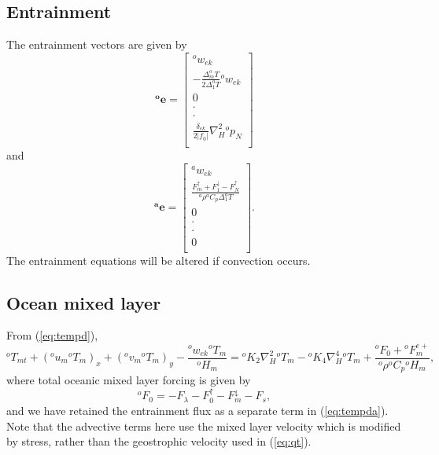 \documentclass[11pt, a4paper,twoside]{article}
\newcommand{\dt}[2]{\Delta_{#2}^{#1}T}
\newcommand{\rhb}[1]{{{}^{#1}\rho}}
\newcommand{\cp}[1]{{{}^{#1}C_p}}
\newcommand{\p}[2]{{{}^{#1}p_{#2}}}
\newcommand{\uu}[2]{{{}^{#1}u_{#2}}}
\newcommand{\vv}[2]{{{}^{#1}v_{#2}}}
\newcommand{\ek}[1]{{{}^{#1}w_{ek}}}
\newcommand{\HH}[2]{{{}^{#1}H_{#2}}}
\newcommand{\kh}[1]{{{}^{#1}K_2}}
\newcommand{\kf}[1]{{{}^{#1}K_4}}
\newcommand{\T}[2]{{{}^{#1}T_{#2}}}
\newcommand{\F}[3]{{{}^{#1}F^{#3}_{#2}}}
\newcommand{\Fup}[1]{{F^{\uparrow}_{#1}}}
\newcommand{\Fdown}[1]{{F^{\downarrow}_{#1}}}
\newcommand{\vc}[1]{\mathbf{#1}}
\newcommand{\delek}[0]{\delta_{ek}}
\numberwithin{equation}{section}
\begin{document}
\subsection{Entrainment}\label{sub:qglayers}
The entrainment vectors are given by
\begin{equation}
\vc{{}^oe} =
\left[ \begin{array}{c}
\ek{o}\\
- \frac{\dt{o}{m}}{2 \dt{o}{1}} \ek{o}\\
0\\
\cdot\\
\cdot\\
\frac{\delek}{2 \lvert f_0 \rvert }\nabla_H^2\p{o}{N}\\
 \end{array}\right]
\end{equation}
and
\begin{equation}\label{eq:ent1a}
\vc{{}^ae} =
\left[ \begin{array}{c}
\ek{a}\\
\frac{\Fup{m}+ \Fdown{1}   - \Fup{N}  }{\rhb{a} \cp{a} \dt{a}{1} }\\
0\\
\cdot\\
\cdot\\
0\\
 \end{array}\right].
\end{equation}
The entrainment equations will be altered if convection occurs.

\subsection{Ocean mixed layer}
From (\ref{eq:tempd}),
\begin{equation}\label{eq:tempda}
\T{o}{mt} + (\uu{o}{m} \T{o}{m})_x + (\vv{o}{m} \T{o}{m})_y  - \frac{\ek{o} \T{o}{m}}{\HH{o}{m}} =  \kh{o}  \nabla_H^2\T{o}{m} - \kf{o}  \nabla_H^4 \T{o}{m}  + \frac{\F{o}{0}{} +  \F{o}{m}{e+}}{\rhb{o} \cp{o}\HH{o}{m} },
\end{equation}
where total oceanic mixed layer forcing is given by
\begin{equation}
\F{o}{0}{} = - F_{\lambda} - \Fup{0} - \Fdown{m} - F_s,
\end{equation}
and we have retained the entrainment flux as a separate term in (\ref{eq:tempda}).
Note that the advective terms here use the mixed layer velocity which is modified by stress, rather than the geostrophic velocity used in (\ref{eq:qt}).
\end{document}
